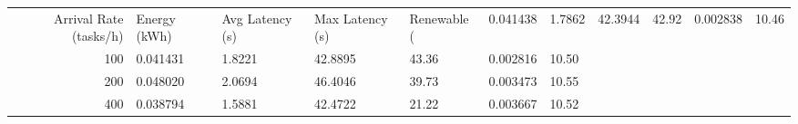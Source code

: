 \begin{tabular}{rllllll}
\toprule
Arrival Rate (tasks/h) & Energy (kWh) & Avg Latency (s) & Max Latency (s) & Renewable (%
 & 0.041438 & 1.7862 & 42.3944 & 42.92 & 0.002838 & 10.46 \\
100 & 0.041431 & 1.8221 & 42.8895 & 43.36 & 0.002816 & 10.50 \\
200 & 0.048020 & 2.0694 & 46.4046 & 39.73 & 0.003473 & 10.55 \\
400 & 0.038794 & 1.5881 & 42.4722 & 21.22 & 0.003667 & 10.52 \\
\bottomrule
\end{tabular}
